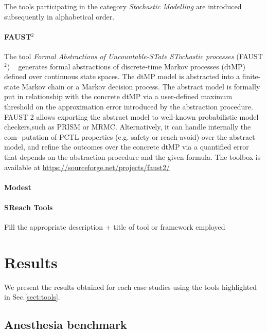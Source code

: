 \documentclass[EPiC]{easychair}
\newcommand{\todo}[1]{
  \begin{framed}
    \noindent{\bf TODO: }
    #1
  \end{framed}
}
\begin{document}
The tools  participating in the category \textit{Stochastic Modelling} are introduced subsequently in alphabetical order.


\paragraph{FAUST$^2$}
The tool \textit{Formal Abstractions of Uncountable-STate STochastic
processes} (FAUST$^2$) ~\cite{soudjani2015faust} generates formal abstractions of discrete-time Markov processes (dtMP) defined over continuous state spaces. The dtMP model is abstracted into a finite-state Markov chain or a Markov decision process. The abstract model is formally put in relationship with the concrete dtMP via a user-defined maximum threshold on the approximation error introduced by the abstraction procedure. FAUST 2 allows exporting the abstract model to well-known probabilistic model checkers,such as PRISM or MRMC. Alternatively, it can handle internally the com-
putation of PCTL properties (e.g. safety or reach-avoid) over the abstract model, and refine the outcomes over the concrete dtMP via a quantified error that depends on the abstraction procedure and the given formula. The toolbox is available at \url{https://sourceforge.net/projects/faust2/}\\

\paragraph{Modest}

\paragraph{SReach Tools}


\todo{ Fill the appropriate description + title of tool or framework employed}
\section{Results}
\label{sect:results}

We present the results obtained for each case studies using the tools highlighted in Sec.\ref{sect:tools}.

\subsection{Anesthesia benchmark}
\newpage
\end{document}
